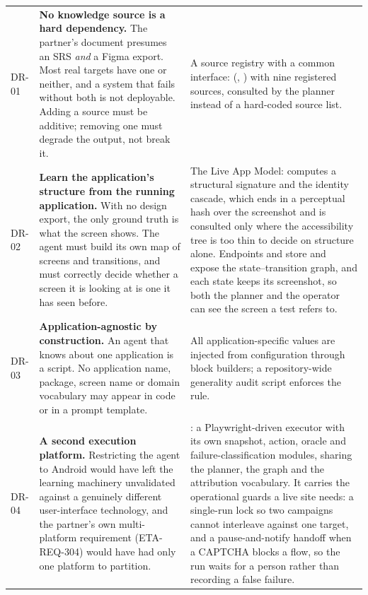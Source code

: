 \begin{xltabular}{\textwidth}{@{}>{\hsize}Y>{\hsize}Y>{\hsize}Y@{}}
  DR-01 & \textbf{No knowledge source is a hard dependency.} The partner's document presumes an SRS \emph{and} a Figma export. Most real targets have one or neither, and a system that fails without both is not deployable. Adding a source must be additive; removing one must degrade the output, not break it. &
  A source registry with a common interface:  (, ) with nine registered sources, consulted by the planner instead of a hard-coded source list. \\
  \addlinespace
  DR-02 & \textbf{Learn the application's structure from the running application.} With no design export, the only ground truth is what the screen shows. The agent must build its own map of screens and transitions, and must correctly decide whether a screen it is looking at is one it has seen before. &
  The Live App Model:  computes a structural signature and the identity cascade, which ends in a perceptual hash over the screenshot and is consulted only where the accessibility tree is too thin to decide on structure alone. Endpoints  and  store and expose the state--transition graph, and each state keeps its screenshot, so both the planner and the operator can see the screen a test refers to. \\
  \addlinespace
  DR-03 & \textbf{Application-agnostic by construction.} An agent that knows about one application is a script. No application name, package, screen name or domain vocabulary may appear in code or in a prompt template. &
  All application-specific values are injected from configuration through  block builders; a repository-wide generality audit script enforces the rule. \\
  \addlinespace
  DR-04 & \textbf{A second execution platform.} Restricting the agent to Android would have left the learning machinery unvalidated against a genuinely different user-interface technology, and the partner's own multi-platform requirement (ETA-REQ-304) would have had only one platform to partition. &
  : a Playwright-driven executor with its own snapshot, action, oracle and failure-classification modules, sharing the planner, the graph and the attribution vocabulary. It carries the operational guards a live site needs: a single-run lock so two campaigns cannot interleave against one target, and a pause-and-notify handoff when a CAPTCHA blocks a flow, so the run waits for a person rather than recording a false failure. \\

\end{xltabular}
